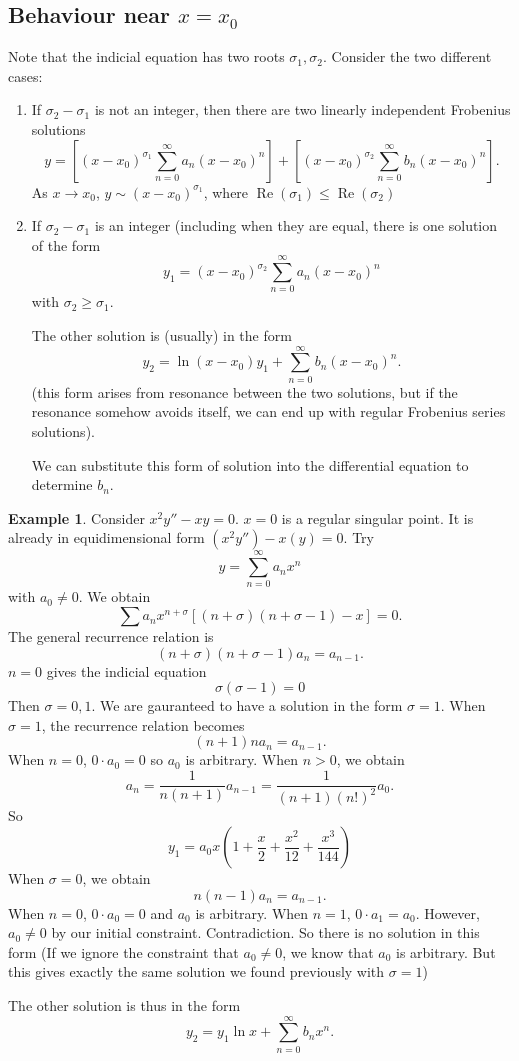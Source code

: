 \documentclass[a4paper]{article}
\theoremstyle{definition}
\newtheorem*{eg}{Example}
\DeclareMathOperator\re{Re}
\begin{document}
\subsection{Behaviour near \texorpdfstring{$x = x_0$}{x = x0}}
Note that the indicial equation has two roots $\sigma_1, \sigma_2$. Consider the two different cases:
\begin{enumerate}
\item If $\sigma_2 - \sigma_1$ is not an integer, then there are two linearly independent Frobenius solutions
\[
y = \left[(x - x_0)^{\sigma_1}\sum_{n = 0}^{\infty} a_n(x - x_0)^n\right] + \left[(x - x_0)^{\sigma_2}\sum_{n = 0}^{\infty} b_n(x - x_0)^n\right].
\]
As $x\to x_0$, $y \sim (x - x_0)^{\sigma_1}$, where $\re(\sigma_1) \leq \re(\sigma_2)$

\item If $\sigma_2 - \sigma_1$ is an integer (including when they are equal, there is one solution of the form
\[
y_1 = (x - x_0)^{\sigma_2}\sum_{n = 0}^{\infty} a_n(x - x_0)^n
\]
with $\sigma_2 \geq \sigma_1$.

The other solution is (usually) in the form
\[
y_2 = \ln(x - x_0)y_1 + \sum_{n = 0}^\infty b_n(x - x_0)^n.
\]
(this form arises from resonance between the two solutions, but if the resonance somehow avoids itself, we can end up with regular Frobenius series solutions).

We can substitute this form of solution into the differential equation to determine $b_n$.

\end{enumerate}
\begin{eg}
  Consider $x^2 y'' - xy = 0$. $x = 0$ is a regular singular point. It is already in equidimensional form $(x^2y'') - x(y) = 0$. Try
\[
y = \sum_{n = 0}^\infty a_n x^n
\]
with $a_0 \not= 0$. We obtain
\[
\sum a_nx^{n + \sigma}[(n + \sigma)(n + \sigma - 1) - x] = 0.
\]
The general recurrence relation is
\[
(n + \sigma)(n + \sigma - 1)a_n = a_{n - 1}.
\]
$n = 0$ gives the indicial equation
\[
\sigma(\sigma - 1) = 0
\]
Then $\sigma = 0, 1$. We are gauranteed to have a solution in the form $\sigma = 1$. When $\sigma = 1$, the recurrence relation becomes
\[
(n + 1)n a_n = a_{n - 1}.
\]
When $n = 0$, $0\cdot a_0 = 0$ so $a_0$ is arbitrary.
When $n > 0$, we obtain
\[
a_n = \frac{1}{n(n +1)}a_{n - 1} = \frac{1}{(n + 1)(n!)^2}a_0.
\]
So
\[
y_1 = a_0x\left(1 + \frac{x}{2} + \frac{x^2}{12} + \frac{x^3}{144}\right)
\]
When $\sigma = 0$, we obtain 
\[
n(n - 1)a_n = a_{n - 1}.
\]
When $n = 0$, $0\cdot a_0 = 0$ and $a_0$ is arbitrary. When $n = 1$, $0\cdot a_1 = a_0$. However, $a_0\not= 0$ by our initial constraint. Contradiction. So there is no solution in this form (If we ignore the constraint that $a_0\not= 0$, we know that $a_0$ is arbitrary. But this gives exactly the same solution we found previously with $\sigma = 1$)

The other solution is thus in the form 
\[
y_2 = y_1\ln x + \sum_{n = 0}^\infty b_nx^n.
\]
\end{eg}
\end{document}
